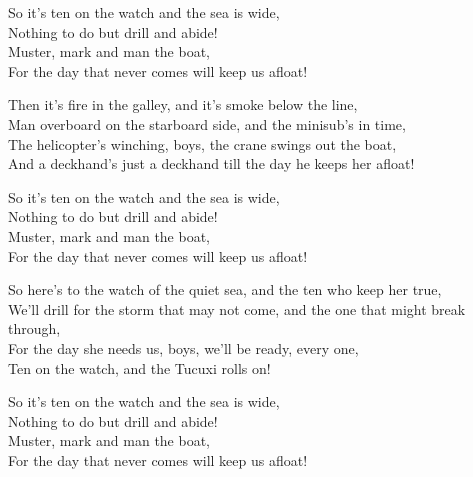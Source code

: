 \begin{lyrics}
So it’s ten on the watch and the sea is wide,\\
Nothing to do but drill and abide!\\
Muster, mark and man the boat,\\
For the day that never comes will keep us afloat!

Then it’s fire in the galley, and it’s smoke below the line,\\
Man overboard on the starboard side, and the minisub’s in time,\\
The helicopter’s winching, boys, the crane swings out the boat,\\
And a deckhand’s just a deckhand till the day he keeps her afloat!

So it’s ten on the watch and the sea is wide,\\
Nothing to do but drill and abide!\\
Muster, mark and man the boat,\\
For the day that never comes will keep us afloat!

So here’s to the watch of the quiet sea, and the ten who keep her true,\\
We’ll drill for the storm that may not come, and the one that might break through,\\
For the day she needs us, boys, we’ll be ready, every one,\\
Ten on the watch, and the Tucuxi rolls on!

So it’s ten on the watch and the sea is wide,\\
Nothing to do but drill and abide!\\
Muster, mark and man the boat,\\
For the day that never comes will keep us afloat!
\end{lyrics}

